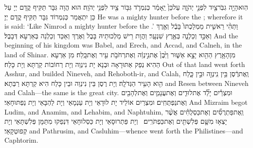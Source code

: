 {הֽוּא\maqqaf הָיָ֥ה גִבֹּֽר\maqqaf צַ֖יִד לִפְנֵ֣י יְהֹוָ֑ה עַל\maqqaf כֵּן֙ יֵֽאָמַ֔ר כְּנִמְרֹ֛ד גִּבּ֥וֹר צַ֖יִד לִפְנֵ֥י יְהֹוָֽה׃}
{הוּא הֲוָה גִּבָּר תַּקִּיף קֳדָם יְיָ עַל כֵּן יִתְאֲמַר כְּנִמְרוֹד גִּבָּר תַּקִּיף קֳדָם יְיָ׃}
{He was a mighty hunter before the \lord; wherefore it is said: ‘Like Nimrod a mighty hunter before the \lord.’}{}
{וַתְּהִ֨י רֵאשִׁ֤ית מַמְלַכְתּוֹ֙ בָּבֶ֔ל וְאֶ֖רֶךְ וְאַכַּ֣ד וְכַלְנֵ֑ה בְּאֶ֖רֶץ שִׁנְעָֽר׃}
{וַהֲוָת רֵישׁ מַלְכוּתֵיהּ בָּבֶל וְאֶרֶךְ וְאַכַּד וְכַלְנֵה בְּאַרְעָא דְּבָבֶל׃}
{And the beginning of his kingdom was Babel, and Erech, and Accad, and Calneh, in the land of Shinar.}{}
{מִן\maqqaf הָאָ֥רֶץ הַהִ֖וא יָצָ֣א אַשּׁ֑וּר וַיִּ֙בֶן֙ אֶת\maqqaf נִ֣ינְוֵ֔ה וְאֶת\maqqaf רְחֹבֹ֥ת עִ֖יר וְאֶת\maqqaf כָּֽלַח׃}
{מִן אַרְעָא הַהִיא נְפַק אַתּוּרָאָה וּבְנָא יָת נִינְוֵה וְיָת רְחוֹבוֹת קַרְתָּא וְיָת כָּלַח׃}
{Out of that land went forth Asshur, and builded Nineveh, and Rehoboth-ir, and Calah,}{}
{וְֽאֶת\maqqaf רֶ֔סֶן בֵּ֥ין נִֽינְוֵ֖ה וּבֵ֣ין כָּ֑לַח הִ֖וא הָעִ֥יר הַגְּדֹלָֽה׃}
{וְיָת רֶסֶן בֵּין נִינְוֵה וּבֵין כָּלַח הִיא קַרְתָּא רַבְּתָא׃}
{and Resen between Nineveh and Calah—the same is the great city.}{}
{וּמִצְרַ֡יִם יָלַ֞ד אֶת\maqqaf לוּדִ֧ים וְאֶת\maqqaf עֲנָמִ֛ים וְאֶת\maqqaf לְהָבִ֖ים וְאֶת\maqqaf נַפְתֻּחִֽים׃}
{וּמִצְרַיִם אוֹלֵיד יָת לוּדָאֵי וְיָת עַנְמָאֵי וְיָת לַהְבָּאֵי וְיָת נַפְתּוּחָאֵי׃}
{And Mizraim begot Ludim, and Anamim, and Lehabim, and Naphtuhim,}{}
{וְֽאֶת\maqqaf פַּתְרֻסִ֞ים וְאֶת\maqqaf כַּסְלֻחִ֗ים אֲשֶׁ֨ר יָצְא֥וּ מִשָּׁ֛ם פְּלִשְׁתִּ֖ים וְאֶת\maqqaf כַּפְתֹּרִֽים׃ \setuma }
{וְיָת פַּתְרוּסָאֵי וְיָת כַּסְלוּחָאֵי דִּנְפַקוּ מִתַּמָּן פְּלִשְׁתָּאֵי וְיָת קְפוּטְקָאֵי׃}
{and Pathrusim, and Casluhim—whence went forth the Philistines—and Caphtorim.}{}
